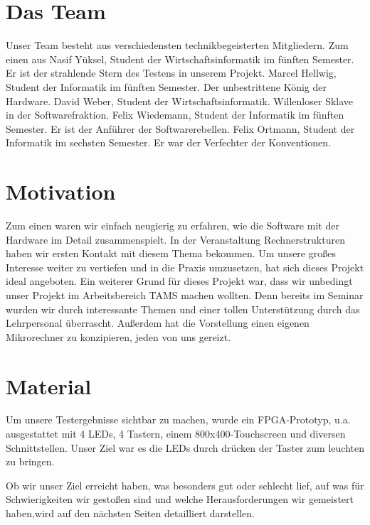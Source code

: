 \section{Das Team}
Unser Team besteht aus verschiedensten technikbegeisterten Mitgliedern. Zum einen aus Nasif Yüksel, Student der Wirtschaftsinformatik im fünften Semester. Er ist der strahlende Stern des Testens in unserem Projekt. Marcel Hellwig, Student der Informatik im fünften Semester. Der unbestrittene König der Hardware. David Weber, Student der Wirtschaftsinformatik. Willenloser Sklave in der Softwarefraktion. Felix Wiedemann, Student der Informatik im fünften Semester. Er ist der Anführer der Softwarerebellen. Felix Ortmann, Student der Informatik im sechsten Semester. Er war der Verfechter der Konventionen.

\section{Motivation}
Zum einen waren wir einfach neugierig zu erfahren, wie die Software mit der Hardware im Detail zusammenspielt. In der Veranstaltung Rechnerstrukturen haben wir ersten Kontakt mit diesem Thema bekommen. Um unsere großes Interesse weiter zu vertiefen und in die Praxis umzusetzen, hat sich dieses Projekt ideal angeboten.
Ein weiterer Grund für dieses Projekt war, dass wir unbedingt unser Projekt im Arbeitsbereich TAMS machen wollten. Denn bereits im Seminar wurden wir durch interessante Themen und einer tollen Unterstützung durch das Lehrpersonal überrascht.
Außerdem hat die Vorstellung einen eigenen Mikrorechner zu konzipieren, jeden von uns gereizt.

\section{Material}
Um unsere Testergebnisse sichtbar zu machen, wurde ein FPGA-Prototyp, u.a. ausgestattet mit 4 LEDs, 4 Tastern, einem 800x400-Touchscreen und diversen Schnittstellen. Unser Ziel war es die LEDs durch drücken der Taster zum leuchten zu bringen. %

Ob wir unser Ziel erreicht haben, was besonders gut oder schlecht lief, auf was für Schwierigkeiten wir gestoßen sind und welche Herausforderungen wir gemeistert haben,wird auf den nächsten Seiten detailliert darstellen. %
